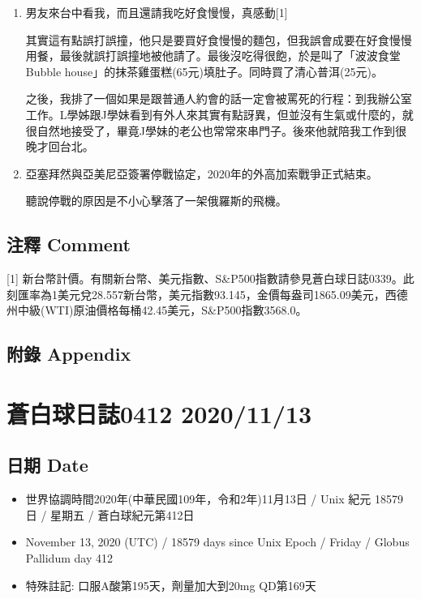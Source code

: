 \documentclass[
]{article}
\providecommand{\tightlist}{%
  \setlength{\itemsep}{0pt}\setlength{\parskip}{0pt}}
\begin{document}
\begin{enumerate}
\def\labelenumi{\arabic{enumi}.}
\item
  男友來台中看我，而且還請我吃好食慢慢，真感動{[}1{]}

  其實這有點誤打誤撞，他只是要買好食慢慢的麵包，但我誤會成要在好食慢慢用餐，最後就誤打誤撞地被他請了。最後沒吃得很飽，於是叫了「波波食堂Bubble
  house」的抹茶雞蛋糕(65元)填肚子。同時買了清心普洱(25元)。

  之後，我排了一個如果是跟普通人約會的話一定會被罵死的行程：到我辦公室工作。L學姊跟J學妹看到有外人來其實有點訝異，但並沒有生氣或什麼的，就很自然地接受了，畢竟J學妹的老公也常常來串門子。後來他就陪我工作到很晚才回台北。
\item
  亞塞拜然與亞美尼亞簽署停戰協定，2020年的外高加索戰爭正式結束。

  聽說停戰的原因是不小心擊落了一架俄羅斯的飛機。
\end{enumerate}

\hypertarget{ux6ce8ux91cb-comment-66}{%
\subsection{注釋 Comment}\label{ux6ce8ux91cb-comment-66}}

{[}1{]}
新台幣計價。有關新台幣、美元指數、S\&P500指數請參見蒼白球日誌0339。此刻匯率為1美元兌28.557新台幣，美元指數93.145，金價每盎司1865.09美元，西德州中級(WTI)原油價格每桶42.45美元，S\&P500指數3568.0。

\hypertarget{ux9644ux9304-appendix-66}{%
\subsection{附錄 Appendix}\label{ux9644ux9304-appendix-66}}

\hypertarget{ux84bcux767dux7403ux65e5ux8a8c0412-20201113}{%
\section{蒼白球日誌0412
2020/11/13}\label{ux84bcux767dux7403ux65e5ux8a8c0412-20201113}}

\hypertarget{ux65e5ux671f-date-67}{%
\subsection{日期 Date}\label{ux65e5ux671f-date-67}}

\begin{itemize}
\tightlist
\item
  世界協調時間2020年(中華民國109年，令和2年)11月13日 / Unix 紀元 18579
  日 / 星期五 / 蒼白球紀元第412日
\item
  November 13, 2020 (UTC) / 18579 days since Unix Epoch / Friday /
  Globus Pallidum day 412
\item
  特殊註記: 口服A酸第195天，劑量加大到20mg QD第169天
\end{itemize}
\end{document}
